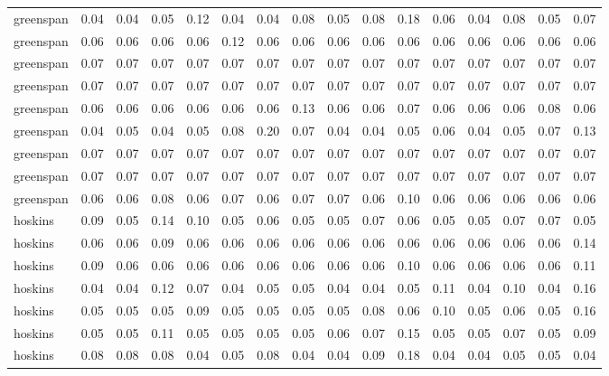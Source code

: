 \begin{tabular}{lrrrrrrrrrrrrrrr}
 greenspan & 0.04 & 0.04 & 0.05 & 0.12 & 0.04 & 0.04 & 0.08 & 0.05 & 0.08 &  0.18 &  0.06 &  0.04 &  0.08 &  0.05 &  0.07 \\
 greenspan & 0.06 & 0.06 & 0.06 & 0.06 & 0.12 & 0.06 & 0.06 & 0.06 & 0.06 &  0.06 &  0.06 &  0.06 &  0.06 &  0.06 &  0.06 \\
 greenspan & 0.07 & 0.07 & 0.07 & 0.07 & 0.07 & 0.07 & 0.07 & 0.07 & 0.07 &  0.07 &  0.07 &  0.07 &  0.07 &  0.07 &  0.07 \\
 greenspan & 0.07 & 0.07 & 0.07 & 0.07 & 0.07 & 0.07 & 0.07 & 0.07 & 0.07 &  0.07 &  0.07 &  0.07 &  0.07 &  0.07 &  0.07 \\
 greenspan & 0.06 & 0.06 & 0.06 & 0.06 & 0.06 & 0.06 & 0.13 & 0.06 & 0.06 &  0.07 &  0.06 &  0.06 &  0.06 &  0.08 &  0.06 \\
 greenspan & 0.04 & 0.05 & 0.04 & 0.05 & 0.08 & 0.20 & 0.07 & 0.04 & 0.04 &  0.05 &  0.06 &  0.04 &  0.05 &  0.07 &  0.13 \\
 greenspan & 0.07 & 0.07 & 0.07 & 0.07 & 0.07 & 0.07 & 0.07 & 0.07 & 0.07 &  0.07 &  0.07 &  0.07 &  0.07 &  0.07 &  0.07 \\
 greenspan & 0.07 & 0.07 & 0.07 & 0.07 & 0.07 & 0.07 & 0.07 & 0.07 & 0.07 &  0.07 &  0.07 &  0.07 &  0.07 &  0.07 &  0.07 \\
 greenspan & 0.06 & 0.06 & 0.08 & 0.06 & 0.07 & 0.06 & 0.07 & 0.07 & 0.06 &  0.10 &  0.06 &  0.06 &  0.06 &  0.06 &  0.06 \\
   hoskins & 0.09 & 0.05 & 0.14 & 0.10 & 0.05 & 0.06 & 0.05 & 0.05 & 0.07 &  0.06 &  0.05 &  0.05 &  0.07 &  0.07 &  0.05 \\
   hoskins & 0.06 & 0.06 & 0.09 & 0.06 & 0.06 & 0.06 & 0.06 & 0.06 & 0.06 &  0.06 &  0.06 &  0.06 &  0.06 &  0.06 &  0.14 \\
   hoskins & 0.09 & 0.06 & 0.06 & 0.06 & 0.06 & 0.06 & 0.06 & 0.06 & 0.06 &  0.10 &  0.06 &  0.06 &  0.06 &  0.06 &  0.11 \\
   hoskins & 0.04 & 0.04 & 0.12 & 0.07 & 0.04 & 0.05 & 0.05 & 0.04 & 0.04 &  0.05 &  0.11 &  0.04 &  0.10 &  0.04 &  0.16 \\
   hoskins & 0.05 & 0.05 & 0.05 & 0.09 & 0.05 & 0.05 & 0.05 & 0.05 & 0.08 &  0.06 &  0.10 &  0.05 &  0.06 &  0.05 &  0.16 \\
   hoskins & 0.05 & 0.05 & 0.11 & 0.05 & 0.05 & 0.05 & 0.05 & 0.06 & 0.07 &  0.15 &  0.05 &  0.05 &  0.07 &  0.05 &  0.09 \\
   hoskins & 0.08 & 0.08 & 0.08 & 0.04 & 0.05 & 0.08 & 0.04 & 0.04 & 0.09 &  0.18 &  0.04 &  0.04 &  0.05 &  0.05 &  0.04 \\

\end{tabular}
